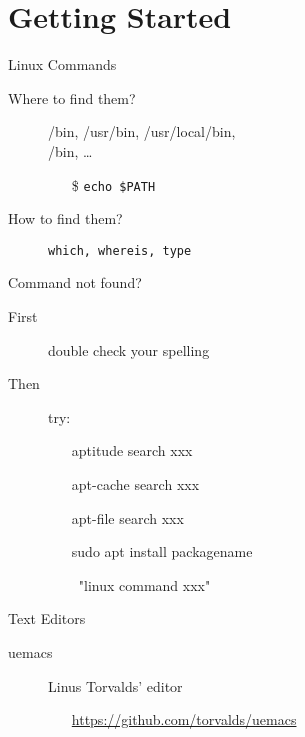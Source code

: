 \mode*
\part{Getting Started}

\begin{frame}{Linux Commands}
  \begin{description}
  \item[Where to find them?] {\ttfamily /bin, /usr/bin, /usr/local/bin,\\/bin,
      \ldots}
    \begin{itemize}
    \item[\$] \texttt{echo \$PATH}
    \end{itemize}
  \item[How to find them?] \texttt{which, whereis, type}
  \end{description}
  \begin{block}{Command not found?}
    \begin{description}
    \item[First] double check your spelling
    \item[Then] try:{\ttfamily
      \begin{itemize}
      \item[\debian] aptitude search xxx
      \item[\debian] apt-cache search xxx
      \item[\debian] apt-file search xxx
      \item[\debian] sudo apt install packagename
      \item[\GG] \google~"linux command xxx"
      \end{itemize}}
    \end{description}
  \end{block}
\end{frame}

\begin{frame}{Text Editors}
  \begin{iblock}{%
      }
    \centering
    \mode<beamer>{ \texttt{[image: vivsemacs]} }%
  \end{iblock}
  \begin{description}
  \item[uemacs] Linus Torvalds' editor
    \begin{itemize}
    \item[\github] \url{https://github.com/torvalds/uemacs}
    \end{itemize}
  \end{description}
\end{frame}

